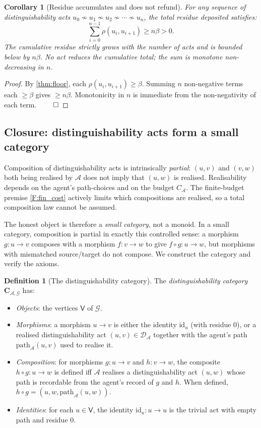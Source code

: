 \documentclass[11pt,a4paper]{article}
\theoremstyle{thmstyle}
\newtheorem{corollary}[theorem]{Corollary}
\theoremstyle{definition}
\newtheorem{definition}[theorem]{Definition}
\theoremstyle{remark}
\newcommand{\Graph}{\mathcal{G}}
\newcommand{\Vrt}{\mathsf{V}}
\newcommand{\Agent}{\mathcal{A}}
\newcommand{\Res}{\rho}
\newcommand{\floor}{\beta}
\begin{document}
\begin{corollary}[Residue accumulates and does not refund]
\label{cor:res_accumulate}
For any sequence of distinguishability acts
$u_0 \not\sim u_1 \not\sim u_2 \not\sim \cdots \not\sim u_n$, the
total residue deposited satisfies:
\[
  \sum_{i=0}^{n-1} \Res(u_i, u_{i+1}) \geq n\floor > 0.
\]
The cumulative residue strictly grows with the number of acts and
is bounded below by $n\floor$. No act reduces the cumulative total;
the sum is monotone non-decreasing in $n$.
\end{corollary}

\begin{proof}
By \cref{thm:floor}, each $\Res(u_i, u_{i+1}) \geq \floor$. Summing
$n$ non-negative terms each $\geq \floor$ gives $\geq n\floor$.
Monotonicity in $n$ is immediate from the non-negativity of each
term. $\qed$
\end{proof}

\subsection{Closure: distinguishability acts form a small category}

Composition of distinguishability acts is intrinsically
\emph{partial}: $(u,v)$ and $(v,w)$ both being realised by $\Agent$
does not imply that $(u,w)$ is realised. Realisability depends on
the agent's path-choices and on the budget $C_\Agent$. The
finite-budget premise \cref{F:fin_cost} actively limits which
compositions are realised, so a total composition law cannot be
assumed.

The honest object is therefore a \emph{small category}, not a
monoid. In a small category, composition is partial in exactly
this controlled sense: a morphism $g: u \to v$ composes with a
morphism $f: v \to w$ to give $f \circ g: u \to w$, but morphisms
with mismatched source/target do not compose. We construct the
category and verify the axioms.

\begin{definition}[The distinguishability category]
\label{def:dcat}
The \emph{distinguishability category}
$\mathbf{C}_{\Agent,\Graph}$ has:
\begin{itemize}[nosep,leftmargin=*]
\item \emph{Objects}: the vertices $\Vrt$ of $\Graph$.
\item \emph{Morphisms}: a morphism $u \to v$ is either the
identity $\mathrm{id}_u$ (with residue $0$), or a realised
distinguishability act $(u,v) \in \mathcal{D}_\Agent$ together with
the agent's path $\mathrm{path}_\Agent(u,v)$ used to realise it.
\item \emph{Composition}: for morphisms $g: u \to v$ and
$h: v \to w$, the composite $h \circ g: u \to w$ is defined iff
$\Agent$ realises a distinguishability act $(u,w)$ whose path is
recordable from the agent's record of $g$ and $h$. When defined,
$h \circ g = (u, w, \mathrm{path}_\Agent(u,w))$.
\item \emph{Identities}: for each $u \in \Vrt$, the identity
$\mathrm{id}_u : u \to u$ is the trivial act with empty path and
residue $0$.
\end{itemize}
\end{definition}
\end{document}
